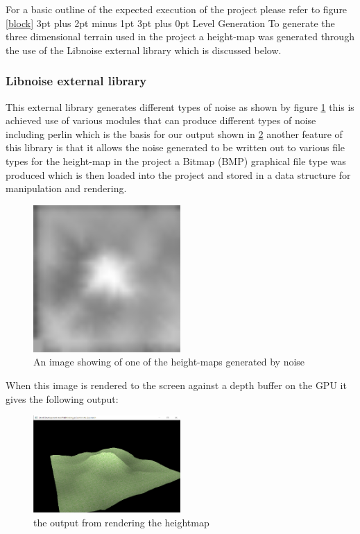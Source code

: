 \documentclass[12pt,a4paper]{article}
\makeatletter
\renewcommand\subsection{\@startsection {subsection}{1}{2mm} %
                               {3pt plus 2pt minus 1pt} %
                               {3pt plus 0pt} %
                               {\normalfont\bfseries}}
\makeatother
\begin{document}
For a basic outline of the expected execution of the project please refer to figure \ref{block}
\subsection{Level Generation}
To generate the three dimensional terrain used in the project a height-map was generated through the use of the Libnoise external library which is discussed below.

\subsubsection{Libnoise external library}
This external library generates different types of noise as shown by figure \ref{noise} this is achieved use of various modules that can produce different types of noise including perlin which is the basis for our output shown in \ref{heightmap} another feature of this library is that it allows the noise generated to be written out to various file types for the height-map in the project a Bitmap (BMP) graphical file type was produced which is then loaded into the project and stored in a data structure for manipulation and rendering.\\
\begin{figure}[ht!]
	\includegraphics[width=0.5\textwidth]{images/heightmaptest}
	\caption{An image showing of one of the height-maps generated by noise}	 \label{noise}
\end{figure}

\pagebreak
When this image is rendered to the screen against a depth buffer on the GPU it gives the following output:
\begin{figure}[ht!]
	\includegraphics[width=0.5\textwidth]{images/Heightmap-output}
	\caption{the output from rendering the heightmap} \label{heightmap}
\end{figure}
\end{document}
